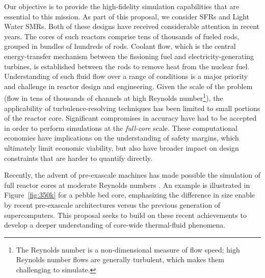 Our objective is to provide the high-fidelity simulation capabilities that are
essential to this mission.  As part of this proposal, we consider SFRs and Light Water SMRs.
Both of these designs have received considerable
attention in recent years. The cores of such reactors comprise tens of
thousands of fueled rods, grouped in bundles of hundreds of rods. Coolant flow,
which is the central energy-transfer mechanism between the fissioning fuel and
electricity-generating turbines, is established between the rods to remove heat
from the nuclear fuel.  Understanding of such fluid flow over a range of
conditions is a major priority and challenge in reactor design and engineering.
Given the scale of the problem (flow in tens of thousands of channels at high
Reynolds number\footnote{The Reynolds number is a non-dimensional measure of flow
speed; high Reynolds number flows are generally turbulent, which makes them
challenging to simulate.}), the
applicability of turbulence-resolving techniques has been limited to small
portions of the reactor core. Significant compromises in accuracy have had to
be accepted in order to perform simulations at the {\em full-core} scale.
These computational economies have implications on the understanding of safety
margins, which ultimately limit economic viability, but also have broader impact
on design constraints that are harder to quantify directly.

Recently, the advent of pre-exascale machines has made possible the simulation
of full reactor cores at moderate Reynolds numbers \cite{Fang2021}.  An example
is illustrated in Figure~\ref{fig:350k} for a pebble bed core, emphasizing the difference
in size enable by recent pre-exascale architectures versus the previous generation of supercomputers.
This proposal seeks to build on these recent achievements to develop a deeper
understanding of core-wide thermal-fluid phenomena.
\vspace*{-.1in}

